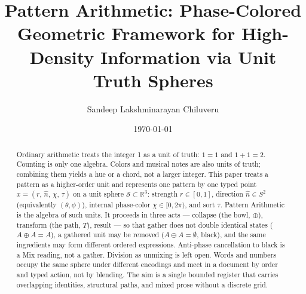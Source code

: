 \documentclass[12pt, a4paper]{article}
\title{Pattern Arithmetic: Phase-Colored Geometric Framework for High-Density Information via Unit Truth Spheres}
\author{Sandeep Lakshminarayan Chiluveru}
\date{\today}
\begin{document}
\maketitle

\begin{abstract}
Ordinary arithmetic treats the integer 1 as a unit of truth: $1=1$ and $1+1=2$. Counting is only one algebra. Colors and musical notes are also units of truth; combining them yields a hue or a chord, not a larger integer. This paper treats a pattern as a higher-order unit and represents one pattern by one typed point
$x = (r,\,\hat n,\,\chi,\,\tau)$
on a unit sphere $\mathcal{S} \subset \mathbb{R}^3$:
strength $r \in [0, 1]$,
direction $\hat n \in S^2$ (equivalently $(\theta,\phi)$),
internal phase-color $\chi \in [0, 2\pi)$,
and sort $\tau$.
Pattern Arithmetic is the algebra of such units. It proceeds in three acts --- collapse (the bowl, $\oplus$), transform (the path, $T$), result --- so that gather does not double identical states ($A \oplus A = A$), a gathered unit may be removed ($A \ominus A = \emptyset$, black), and the same ingredients may form different ordered expressions. Anti-phase cancellation to black is a Mix reading, not a gather. Division as unmixing is left open. Words and numbers occupy the same sphere under different encodings and meet in a document by order and typed action, not by blending. The aim is a single bounded register that carries overlapping identities, structural paths, and mixed prose without a discrete grid.
\end{abstract}
\end{document}
